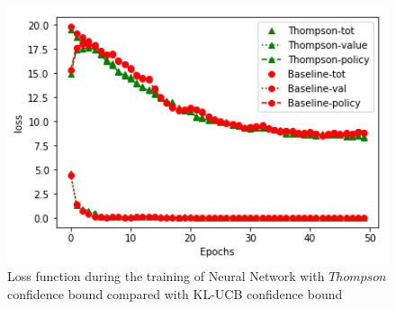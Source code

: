 \begin{figure}
 	[!htb]\centering
    \includegraphics[width=6in]{images/kl-ucbVSthompson.png}
    \caption{Loss function during the training of Neural Network with $Thompson$ confidence bound compared with KL-UCB confidence bound}
  \label{fig:phase}
  \end{figure}
























